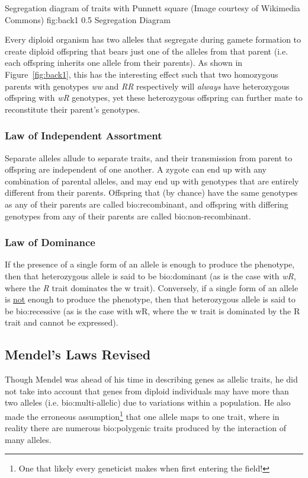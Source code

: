 	{Segregation diagram of traits with Punnett square (Image courtesy of Wikimedia Commons)}
	{fig:back1}
	{0.5}
	{Segregation Diagram}

Every diploid organism has two alleles that segregate during gamete formation to create diploid offspring that bears just one of the alleles from that parent (i.e. each offspring inherits one allele from their parents). As shown in Figure~\ref{fig:back1}, this has the interesting effect such that two homozygous parents with genotypes \textit{ww} and \textit{RR} respectively will \textit{always} have heterozygous offspring with \textit{wR} genotypes, yet these heterozygous offspring can further mate to reconstitute their parent's genotypes.


\subsubsection{Law of Independent Assortment}

Separate alleles allude to separate traits, and their transmission from parent to offspring are independent of one another. A zygote can end up with any combination of parental alleles, and may end up with genotypes that are entirely different from their parents. Offspring that (by chance) have the same genotypes as any of their parents are called \gls{bio:recombinant}, and offspring with differing genotypes from any of their parents are called \gls{bio:non-recombinant}.

\subsubsection{Law of Dominance}

If the presence of a single form of an allele is enough to produce the phenotype, then that heterozygous allele is said to be \gls{bio:dominant} (as is the case with \textit{wR}, where the \textit{R} trait dominates the w trait). Conversely, if a single form of an allele is \underline{not} enough to produce the phenotype, then that heterozygous allele is said to be \gls{bio:recessive} (as is the case with wR, where the w trait is dominated by the R trait and cannot be expressed).


\subsection{Mendel's Laws Revised}

Though Mendel was ahead of his time in describing genes as allelic traits, he did not take into account that genes from diploid individuals may have more than two alleles (i.e. \gls{bio:multi-allelic}) due to variations within a population.  He also made the erroneous assumption\footnote{One that likely every geneticist makes when first entering the field!} that one allele maps to one trait, where in reality there are numerous \gls{bio:polygenic traits} produced by the interaction of many alleles. 

